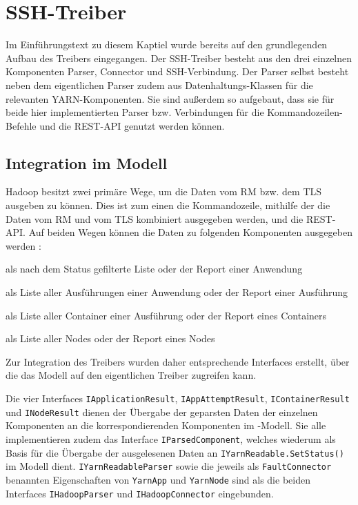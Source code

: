 \section{SSH-Treiber}\label{sec:sshDriver}

Im Einführungstext zu diesem Kaptiel wurde bereits auf den grundlegenden Aufbau des Treibers eingegangen. Der SSH-Treiber besteht aus den drei einzelnen Komponenten Parser, Connector und SSH-Verbindung. Der Parser selbst besteht neben dem eigentlichen Parser zudem aus Datenhaltungs-Klassen für die relevanten YARN-Komponenten. Sie sind außerdem so aufgebaut, dass sie für beide hier implementierten Parser bzw. Verbindungen für die Kommandozeilen-Befehle und die REST-API genutzt werden können.

\subsection{Integration im Modell}\label{sec:modelIntegration}

Hadoop besitzt zwei primäre Wege, um die Daten vom \ac{RM} bzw. dem \ac{TLS} ausgeben zu können. Dies ist zum einen die Kommandozeile, mithilfe der die Daten vom \ac{RM} und vom \ac{TLS} kombiniert ausgegeben werden, und die REST-API. Auf beiden Wegen können \uA die Daten zu folgenden Komponenten ausgegeben werden \cite{HadoopYarnTlServer271,HadoopYarnCmds271,HadoopRmApi271,HadoopNmApi271}:

\begin{description}[noitemsep]
    \item[Anwendungen] als nach dem Status gefilterte Liste oder der Report einer Anwendung
    \item[Ausführungen] als Liste aller Ausführungen einer Anwendung oder der Report einer Ausführung
    \item[Container] als Liste aller Container einer Ausführung oder der Report eines Containers
    \item[Nodes] als Liste aller Nodes oder der Report eines Nodes
\end{description}

Zur Integration des Treibers wurden daher entsprechende Interfaces erstellt, über die das Modell auf den eigentlichen Treiber zugreifen kann.

Die vier Interfaces \texttt{IApplicationResult}, \texttt{IAppAttemptResult}, \texttt{IContainerResult} und \texttt{INodeResult} dienen der Übergabe der geparsten Daten der einzelnen Komponenten an die korrespondierenden Komponenten im \sS-Modell. Sie alle implementieren zudem das Interface \texttt{IParsedComponent}, welches wiederum als Basis für die Übergabe der ausgelesenen Daten an \texttt{IYarnReadable.SetStatus()} im Modell dient. \texttt{IYarnReadableParser} sowie die jeweils als \texttt{FaultConnector} benannten Eigenschaften von \texttt{YarnApp} und \texttt{YarnNode} sind als die beiden Interfaces \texttt{IHadoopParser} und \texttt{IHadoopConnector} eingebunden.

